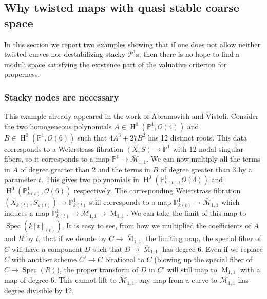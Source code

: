 \documentclass{amsart}
\newcommand{\bP}{\mathbb{P}}
\newcommand{\oH}{\operatorname{H}}
\newcommand{\cM}{\mathcal{M}}
\newcommand{\cO}{\mathcal{O}}
\newcommand{\cP}{\mathcal{P}}
\newcommand{\spec}{\operatorname{Spec}}
\theoremstyle{definition}
\begin{document}
\subsection{Why twisted maps with quasi stable coarse space}
In this section we report two examples showing that if one does not allow neither twisted curves nor destabilizing stacky $\cP^1$s, then there is no hope to find a moduli space satisfying the existence part of the valuative criterion for properness.

\subsubsection{Stacky nodes are necessary}\label{subsection stacky nodes are necessary}
This example already appeared in the work of Abramovich and Vistoli. Consider the two homogeneous polynomials
$A\in \oH^0(\bP^1, \cO(4)) $ and $B \in \oH^0(\bP^1, \cO(6))$ such that $4A^3 + 27B^2$ has 12 distinct roots. This data corresponds to a Weierstrass fibration $(X,S)\to \bP^1$ with 12 nodal singular fibers, so it corresponds to
a map $\bP^1\to \overline{\cM}_{1,1}$.
We can now multiply all the terms in $A$ of degree greater than 2 and the terms in $B$ of degree greater than 3 by a parameter $t$. This gives two polynomials in $\oH^0(\bP^1_{k(t)}, \cO(4))$ and $\oH^0(\bP^1_{k(t)}, \cO(6))$ respectively. The corresponding Weierstrass fibration $(X_{k(t)},S_{k(t)})\to \bP^1_{k(t)}$ still corresponds to a map $\bP^1_{k(t)}\to \overline{\cM}_{1,1}$ which induces a map $\bP^1_{k(t)}\to \overline{\cM}_{1,1}\to \overline{\operatorname{M}}_{1,1}$. We can take the limit of this map to $\spec(k[t]_{(t)})$. It is
easy to see, from how we multiplied the coefficients of $A$ and $B$ by $t$, that if we denote by $C\to \overline{\operatorname{M}}_{1,1}$ the limiting map, the special
fiber of $C$ will have a component $D$ such that $D\to \overline{\operatorname{M}}_{1,1}$ has degree 6. Even if we replace $C$ with another scheme $C'\to C$ birational to $C$ (blowing up the special fiber of $C\to \spec(R)$), the proper transform of $D$ in $C'$ will still map to $\overline{\operatorname{M}}_{1,1}$ with a map of degree 6. This cannot lift to $\overline{\cM}_{1,1}$: any map from a curve to $\overline{\cM}_{1,1}$ has degree divisible by 12.
\end{document}
